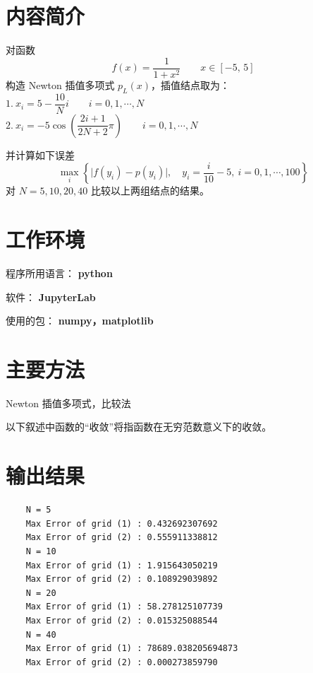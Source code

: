 \documentclass{ctexart}
\begin{document}
\section*{内容简介}
	\noindent 对函数 
	\begin{equation}
		f(x) = \dfrac{1}{1 + x^2}\qquad x\in[−5,\,5]
	\end{equation}
	构造 Newton 插值多项式 $p_L(x)$，插值结点取为：\\
	
	$1.\ x_i = 5 − \dfrac{10}{N} i \qquad i = 0, 1, \cdots, N$\\
	
	$2.\ x_i = −5\cos\left(\dfrac{2i + 1}{2N + 2}\pi\right) \qquad i = 0, 1, \cdots, N$
	
	\noindent 并计算如下误差
	\begin{equation}
		\max\limits_i\left\{\Big|f(y_i) − p(y_i)\Big|,\quad y_i = \dfrac{i}{10} − 5,\ i = 0, 1, \cdots, 100\right\}
	\end{equation}
	对 $N = 5, 10, 20, 40$ 比较以上两组结点的结果。
	
\section*{工作环境}
	程序所用语言： {\bf python}
	
	软件： {\bf JupyterLab}
	
	使用的包： {\bf numpy，matplotlib}
	
\section*{主要方法}
	Newton 插值多项式，比较法
	
	以下叙述中函数的“收敛”将指函数在无穷范数意义下的收敛。

\section*{输出结果}

\begin{verbatim}
	N = 5
	Max Error of grid (1) : 0.432692307692
	Max Error of grid (2) : 0.555911338812
	N = 10
	Max Error of grid (1) : 1.915643050219
	Max Error of grid (2) : 0.108929039892
	N = 20
	Max Error of grid (1) : 58.278125107739
	Max Error of grid (2) : 0.015325088544
	N = 40
	Max Error of grid (1) : 78689.038205694873
	Max Error of grid (2) : 0.000273859790
\end{verbatim}
\end{document}
